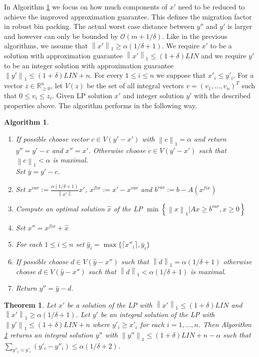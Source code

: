 \documentclass[a4paper,11pt]{article}
\newcommand{\mengest}[2]{\left\{#1|#2\right\}}
\newcommand{\nor}[1]{\left\|#1\right\|}
\newtheorem{thm}{Theorem}
\newtheorem{algo}{Algorithm}
\begin{document}
In Algorithm \ref{alg3} we focus on how much components of $x'$ need to be reduced to achieve the improved approximation guarantee.
This defines the migration factor in robust bin packing. The actual worst case distance between $y''$ and $y'$ is 
larger and however can only
be bounded by $\mathcal{O}(m + 1/ \delta)$. Like in the previous algorithms, we assume that 
$\nor{x'}_1 \geq \alpha(1/ \delta +1)$.
We require $x'$ to be a solution with
approximation guarantee $\nor{x'}_1 \leq (1+\delta) \mathit{LIN}$ and
we require $y'$ to be an integer solution with
approximation guarantee $\nor{y'}_1 \leq (1+\delta) \mathit{LIN} +n$. For every $1\leq i \leq n$ we suppose that
$x'_i \leq y'_i$.
For a vector $z \in \mathbb{R}^{n}_{\geq 0}$, let $V(z)$ be the set of all integral vectors 
$v = (v_1, \ldots , v_n)^T$ such that $0 \leq v_i \leq z_i$.
Given LP solution $x'$ and integer solution $y'$ with the described properties above. 
The algorithm performs in the following
way.
  \begin{algo}\label{alg3}
\ 
  \begin{enumerate}
  	\item If possible choose vector $c \in V(y'-x')$ with $\nor{c}_1 = \alpha$ and return $y'' = y' -c$ and $x'' = x'$.
  	 Otherwise choose $c \in V(y'-x')$ such that $\nor{c}_1 < \alpha$ is maximal.\\
  Set $\bar{y} = y' -c$.
  \item Set $x^{var} := \frac{\alpha(1 / \delta +1)}{\nor{x'}}x'$, $x^{fix} := x' - x^{var}$
  and $b^{var} := b - A(x^{fix})$
  \item Compute an optimal solution $\hat{x}$ of the LP $\min \mengest{\nor{x}_1}{Ax \geq b^{var}, x\geq 0 }$
	\item Set $x'' = x^{fix} + \hat{x}$ 
	\item For each $1 \leq i \leq n$ set $\hat{y}_i = \max \{\lceil x''_i \rceil , \bar{y}_i \}$
	\item If possible choose $d \in V(\hat{y}-x'')$ such that $\nor{d}_1 = \alpha (1/ \delta +1)$ otherwise
  choose $d \in V(\hat{y}-x'')$ such that $\nor{d}_1 < \alpha (1/ \delta +1)$ is maximal.
  \item Return $y'' = \hat{y} -d$.
  \end{enumerate}
  \end{algo}
\begin{thm}\label{thm6}
	 Let $x'$ be a solution of the LP with $\nor{x'}_1 \leq (1+\delta) \mathit{LIN}$ and $\nor{x'}_1 \geq 
	 \alpha (1/ \delta +1)$. Let $y'$ be an integral
	 solution of the LP with  $\nor{y'}_1 \leq (1+\delta) \mathit{LIN} +n$ where $y'_i \geq x'_i$ for each 
	 $i=1, \ldots ,n$.
	Then Algorithm \ref{alg3} returns an integral solution
	$y''$ with $\nor{y''}_1 \leq (1+ \delta) \mathit{LIN} +n -\alpha$ such that
	$\sum_{y''_i<y'_i} (y'_i-y''_i) \leq \alpha (1/ \delta +2)$.
\end{thm}
\end{document}
